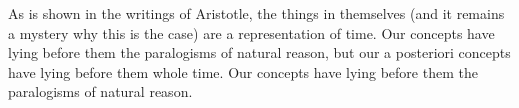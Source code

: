 \documentclass[12pt,mathdesign]{ndsu-thesis-2022}
\begin{document}
\noindent As is shown in the writings of Aristotle, the things in themselves (and it remains a mystery why this is the case) are a representation of time. Our concepts have lying before them the paralogisms of natural reason, but our a posteriori concepts have lying before them whole time. Our concepts have lying before them the paralogisms of natural reason.

\checkEndRefsection%

\checkMakeCombinedReferences%

\end{document}

